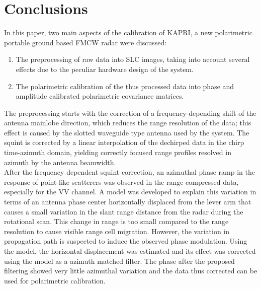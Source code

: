 \section{Conclusions}\label{sec:conclusions}
In this paper, two main aspects of the calibration of KAPRI, a new polarimetric portable ground based FMCW radar were discussed:
\begin{enumerate}
	\item The preprocessing of raw data into SLC images, taking into account several effects due to the peculiar hardware design of the system.
	\item The polarimetric calibration of the thus processed data into phase and amplitude calibrated polarimetric covariance matrices.
\end{enumerate}
The preprocessing starts with the correction of a frequency-depending shift of the antenna mainlobe direction, which reduces the range resolution of the data; this effect is caused by the slotted waveguide type antenna used by the system. The squint is corrected by a linear interpolation of the dechirped data in the chirp time-azimuth domain, yielding correctly focused range profiles resolved in azimuth by the antenna beamwidth.\\
After the frequency dependent squint correction, an azimuthal phase ramp in the response of point-like scatterers was observed in the range compressed data, especially for the VV channel. A model was developed to explain this variation in terms of an antenna phase center horizontally displaced from the lever arm that causes a small variation in the slant range distance from the radar during the rotational scan. This change in range is too small compared to the range resolution to cause visible range cell migration. However, the variation in propagation path is suspected to induce the observed phase modulation. Using the model, the horizontal displacement was estimated and its effect was corrected using the model as a azimuth matched filter. The phase after the proposed filtering showed very little azimuthal variation and the data thus corrected can be used for polarimetric calibration.\\
